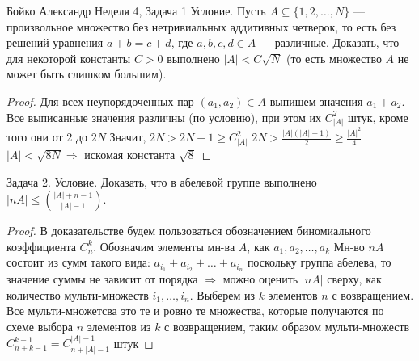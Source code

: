 \documentclass[a4paper,12pt]{article}
\numberwithin{equation}{section}
\theoremstyle{plain}
\theoremstyle{definition}
\theoremstyle{remark}
\begin{document}

Бойко Александр
\newline
\newline
Неделя 4, Задача 1 \newline
Условие. Пусть $A \subseteq \{ 1,2,\dots, N \}$ --- произвольное множество без
нетривиальных аддитивных четверок, то есть без решений уравнения $a+b = c+d$, где  $a,b,c,d \in A$ --- различные.
Доказать, что для некоторой константы $C>0$ выполнено $|A| < C\sqrt{N}$ (то есть множество $A$ не может быть слишком большим).
\begin{proof}
Для всех неупорядоченных пар $(a_1, a_2) \in A$ выпишем значения $a_1 + a_2$. \newline
Все выписанные значения различны (по условию), при этом их $C_{|A|}^2$ штук, кроме того они от 2 до $2N$ \newline
Значит, $2N > 2N-1 \geq C_{|A|}^2$ \newline \newline
$2N > \frac{|A|(|A|-1)}{2} \geq \frac{|A|^2}{4}$ \newline \newline
$|A| < \sqrt{8N} \Rightarrow$ искомая константа $\sqrt{8}$ 
\end{proof} \newline \newline
Задача 2. \newline
Условие. Доказать, что в абелевой группе выполнено $|nA| \le \binom{|A|+n-1}{|A|-1}$.
\begin{proof}
В доказательстве будем пользоваться обозначением биномиального коэффициента $C_n^k$. \newline
Обозначим элементы мн-ва $A$, как $a_1, a_2, \ldots, a_k$ \newline
Мн-во $nA$ состоит из сумм такого вида: $a_{i_1} + a_{i_2} + \ldots + a_{i_n}$ \newline
поскольку группа абелева, то значение суммы не зависит от порядка $\Rightarrow$ можно оценить $|nA|$ сверху, как количество мульти-множеств $i_1, \ldots, i_n$. \newline
Выберем из $k$ элементов $n$ с возвращением. Все мульти-множетсва это те и ровно те множества, которые получаются по схеме выбора $n$ элементов из $k$ с возвращением, таким образом мульти-множеств $C_{n+k-1}^{k-1} = C_{n+|A|-1}^{|A|-1}$ штук
\end{proof}
\end{document}

